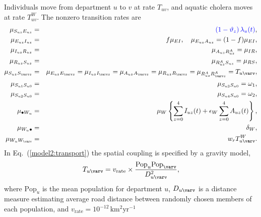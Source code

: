 \documentclass[10pt,letterpaper]{article}\usepackage[]{graphicx}\usepackage[table]{xcolor}
\newcommand\muIR{\mu_{IR}}
\newcommand\muEI{\mu_{EI}}
\newcommand\muRS{\mu_{RS}}
\newcommand\vaccineEfficacy{\vartheta}
\newcommand\symptomFrac{f}
\newcommand\asymptomRelativeShed{\epsilon_{W}}
\newcommand\Wremoval{\delta_W}
\newcommand\Wshed{\mu_W}
\newcommand\vaccCounter{z}
\newcommand\demography{\bullet}
\newcommand\myeqref[1]{(\ref{#1})}
\begin{document}
Individuals move from department $u$ to $v$ at rate $T_{uv}$, and aquatic cholera moves at rate $T^W_{uv}$.
The nonzero transition rates are
\begin{eqnarray}
\label{model2:mu_SE}
\mu_{S_{u\vaccCounter}E_{u\vaccCounter}} &=& \new{(1 - \vaccineEfficacy_\vaccCounter) \, \lambda_u(t)},
\\
\label{model2:mu_EI}
\mu_{E_{u\vaccCounter}I_{u\vaccCounter}} &=& \symptomFrac\muEI, \quad \mu_{E_{u\vaccCounter}A_{u\vaccCounter}} = (1-\symptomFrac)\muEI,
\\
\label{model2:mu_IR}
\mu_{I_{u\vaccCounter}R_{u\vaccCounter}} &=& \mu_{A_{u\vaccCounter}R^A_{u\vaccCounter}} = \muIR,
\\
\label{model2:RS}
\mu_{R_{u\vaccCounter}S_{u\vaccCounter}} &=& \mu_{R^A_{u\vaccCounter}S_{u\vaccCounter}} = \muRS,
\\
\label{model2:transport}
\mu_{S_{u\vaccCounter}S_{{\varv}\vaccCounter}} &=& \mu_{E_{u\vaccCounter}E_{{\varv}\vaccCounter}} = \mu_{I_{u\vaccCounter} I_{{\varv}\vaccCounter}} = \mu_{A_{u\vaccCounter}A_{{\varv}\vaccCounter}} = \mu_{R_{u\vaccCounter}R_{{\varv}\vaccCounter}} = \mu_{R^A_{u\vaccCounter} R^A_{{\varv}\vaccCounter}} = T_{u\varv},
\\
\label{model2:omega1}
\mu_{S_{u1}S_{u0}} &=& \mu_{S_{u3}S_{u0}} = \omega_1,
\\
\label{model2:omega2}
\mu_{S_{u2}S_{u0}} &=& \mu_{S_{u4}S_{u0}} = \omega_2,
\\
\label{model2:to_W}
\mu_{\demography W_u} &=& \Wshed \left\{ \sum_{\vaccCounter=0}^4 I_{u\vaccCounter}(t) + \asymptomRelativeShed \sum_{\vaccCounter=0}^4 A_{u\vaccCounter}(t) \right\},
\\
\label{model2:from_W}
\mu_{W_u\demography} &=& \Wremoval,
\\
\label{model2:water_transport}
\mu_{W_uW_{\varv}} &=& w_r T^W_{u\varv}.
\end{eqnarray}
In Eq.~\myeqref{model2:transport} the spatial coupling is specified by a gravity model,
\begin{equation}
\label{model2:gravity}
T_{u\varv} = v_{\mathrm{rate}} \times \frac{\mathrm{Pop}_u \mathrm{Pop}_{\varv}}{D_{u\varv}^2},
\end{equation}
where $\mathrm{Pop}_u$ is the mean population for department $u$,
$D_{u\varv}$ is a distance measure estimating average road distance between randomly chosen members of each population, and $v_{\mathrm{rate}}= 10^{-12} \,\mbox{km$^2$yr$^{-1}$}$ 
\end{document}
